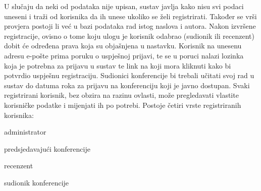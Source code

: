 		U slučaju da neki od podataka nije upisan, sustav javlja kako nisu svi podaci uneseni i traži od korisnika da ih unese ukoliko se želi registrirati. Također se vrši provjera postoji li već u bazi podataka rad istog naslova i autora. Nakon izvršene registracije, ovisno o tome koju ulogu je korisnik odabrao (sudionik ili recenzent) dobit će određena prava koja su objašnjena u nastavku. Korisnik na unesenu adresu e-pošte prima poruku o uspješnoj prijavi, te se u poruci nalazi lozinka koja je potrebna za prijavu u sustav te link na koji mora kliknuti kako bi potvrdio uspješnu registraciju. Sudionici konferencije bi trebali učitati svoj rad u sustav do datuma roka za prijavu na konferenciju koji je javno dostupan.
		\newline
		\newline
		\indent Svaki registrirani korisnik, bez obzira na razinu ovlasti, može pregledavati vlastite korisničke podatke i mijenjati ih po potrebi.
		\newline
		\newline
		Postoje četiri vrste registriranih korisnika:
		\begin{packed_item}
			
			\item administrator
			\item predsjedavajući konferencije
			\item recenzent
			\item sudionik konferencije
			
		\end{packed_item}
	

